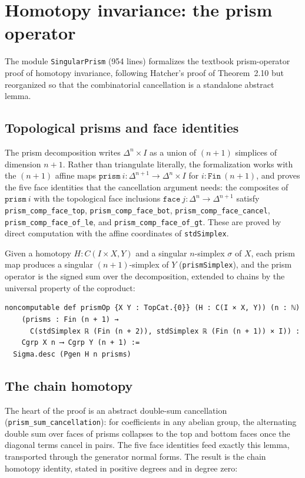 \documentclass[11pt]{article}
\theoremstyle{remark}
\newcommand{\leanname}[1]{\texttt{#1}}
\begin{document}
\section{Homotopy invariance: the prism operator}\label{sec:prism}

The module \leanname{SingularPrism} (954 lines) formalizes the textbook
prism-operator proof of homotopy invariance, following Hatcher's proof of
Theorem~2.10 but reorganized so that the combinatorial cancellation is a
standalone abstract lemma.

\subsection{Topological prisms and face identities}

The prism decomposition writes $\Delta^n \times I$ as a union of $(n+1)$
simplices of dimension $n+1$. Rather than triangulate literally, the
formalization works with the $(n+1)$ affine maps
$\leanname{prism}\ i : \Delta^{n+1} \to \Delta^n \times I$ for
$i : \leanname{Fin}\ (n+1)$, and proves the five face identities that the
cancellation argument needs: the composites of $\leanname{prism}\ i$ with
the topological face inclusions
$\leanname{face}\ j : \Delta^n \to \Delta^{n+1}$ satisfy
\leanname{prism\_comp\_face\_top}, \leanname{prism\_comp\_face\_bot},
\leanname{prism\_comp\_face\_cancel}, \leanname{prism\_comp\_face\_of\_le},
and \leanname{prism\_comp\_face\_of\_gt}. These are proved by direct
computation with the affine coordinates of \leanname{stdSimplex}.

Given a homotopy $H : C(I \times X, Y)$ and a singular $n$-simplex $\sigma$
of $X$, each prism map produces a singular $(n+1)$-simplex of $Y$
(\leanname{prismSimplex}), and the prism operator is the signed sum over the
decomposition, extended to chains by the universal property of the
coproduct:

\begin{lstlisting}
noncomputable def prismOp {X Y : TopCat.{0}} (H : C(I × X, Y)) (n : ℕ)
    (prisms : Fin (n + 1) →
      C(stdSimplex ℝ (Fin (n + 2)), stdSimplex ℝ (Fin (n + 1)) × I)) :
    Cgrp X n ⟶ Cgrp Y (n + 1) :=
  Sigma.desc (Pgen H n prisms)
\end{lstlisting}

\subsection{The chain homotopy}

The heart of the proof is an abstract double-sum cancellation
(\leanname{prism\_sum\_cancellation}): for coefficients in any abelian
group, the alternating double sum over faces of prisms collapses to the top
and bottom faces once the diagonal terms cancel in pairs. The five face
identities feed exactly this lemma, transported through the generator normal
forms. The result is the chain homotopy identity, stated in positive degrees
and in degree zero:
\end{document}
